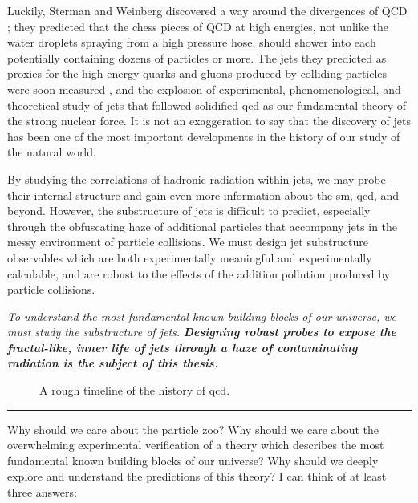 Luckily, Sterman and Weinberg discovered a way around the divergences of QCD \cite{Sterman:1977wj};
%
they predicted that the chess pieces of QCD at high energies, not unlike the water droplets spraying from a high pressure hose, should shower into  each potentially containing dozens of particles or more.
%
The jets they predicted as proxies for the high energy quarks and gluons produced by colliding particles were soon measured \cite{Hanson:1975fe,Wiik:1979cq,Barber:1979yr,TASSO:1979zyf,PLUTO:1979dxn,JADE:1979rke,Ali:1979em,Hanson:1981em,Ali:2010tw}, and the explosion of experimental, phenomenological, and theoretical study of jets that followed solidified \gls{qcd} as our fundamental theory of the strong nuclear force.
%
It is not an exaggeration to say that the discovery of jets has been one of the most important developments in the history of our study of the natural world.

By studying the correlations of hadronic radiation within jets, we may probe their internal structure and gain even more information about the \gls{sm}, \gls{qcd}, and beyond.
%
However, the substructure of jets is difficult to predict, especially through the obfuscating haze of additional particles that accompany jets in the messy environment of particle collisions.
%
We must design jet substructure observables which are both experimentally meaningful and experimentally calculable, and are robust to the effects of the addition pollution produced by particle collisions.

\textit{To understand the most fundamental known building blocks of our universe, we must study the substructure of jets.}
%
\textbf{\textit{Designing robust probes to expose the fractal-like, inner life of jets through a haze of contaminating radiation is the subject of this thesis.}}



\begin{figure}[]
    {
        \hspace{-2.8cm}
        
    }
    \caption[A rough timeline of the history of \gls{qcd}.]
    {
        A rough timeline of the history of \gls{qcd}.
    }
    \label{fig:qcd-timeline}
\end{figure}


\vspace{1.0cm}
\hrule
\vspace{1.0cm}


Why should we care about the particle zoo?
%
Why should we care about the overwhelming experimental verification of a theory which describes the most fundamental known building blocks of our universe?
%
Why should we deeply explore and understand the predictions of this theory?
%
I can think of at least three answers:

